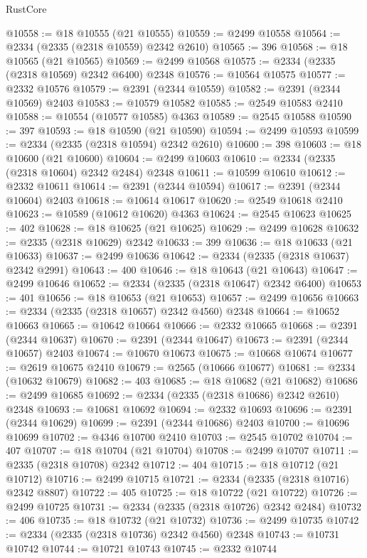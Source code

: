 \begin{lexlean}{RustCore}
\begin{coremodule}
@10558 := @18 @10555 (@21 @10555)
@10559 := @2499 @10558
@10564 := @2334 (@2335 (@2318 @10559) @2342 @2610)
@10565 := 396
@10568 := @18 @10565 (@21 @10565)
@10569 := @2499 @10568
@10575 := @2334 (@2335 (@2318 @10569) @2342 @6400) @2348
@10576 := @10564 @10575
@10577 := @2332 @10576
@10579 := @2391 (@2344 @10559)
@10582 := @2391 (@2344 @10569) @2403
@10583 := @10579 @10582
@10585 := @2549 @10583 @2410
@10588 := @10554 (@10577 @10585) @4363
@10589 := @2545 @10588
@10590 := 397
@10593 := @18 @10590 (@21 @10590)
@10594 := @2499 @10593
@10599 := @2334 (@2335 (@2318 @10594) @2342 @2610)
@10600 := 398
@10603 := @18 @10600 (@21 @10600)
@10604 := @2499 @10603
@10610 := @2334 (@2335 (@2318 @10604) @2342 @2484) @2348
@10611 := @10599 @10610
@10612 := @2332 @10611
@10614 := @2391 (@2344 @10594)
@10617 := @2391 (@2344 @10604) @2403
@10618 := @10614 @10617
@10620 := @2549 @10618 @2410
@10623 := @10589 (@10612 @10620) @4363
@10624 := @2545 @10623
@10625 := 402
@10628 := @18 @10625 (@21 @10625)
@10629 := @2499 @10628
@10632 := @2335 (@2318 @10629) @2342
@10633 := 399
@10636 := @18 @10633 (@21 @10633)
@10637 := @2499 @10636
@10642 := @2334 (@2335 (@2318 @10637) @2342 @2991)
@10643 := 400
@10646 := @18 @10643 (@21 @10643)
@10647 := @2499 @10646
@10652 := @2334 (@2335 (@2318 @10647) @2342 @6400)
@10653 := 401
@10656 := @18 @10653 (@21 @10653)
@10657 := @2499 @10656
@10663 := @2334 (@2335 (@2318 @10657) @2342 @4560) @2348
@10664 := @10652 @10663
@10665 := @10642 @10664
@10666 := @2332 @10665
@10668 := @2391 (@2344 @10637)
@10670 := @2391 (@2344 @10647)
@10673 := @2391 (@2344 @10657) @2403
@10674 := @10670 @10673
@10675 := @10668 @10674
@10677 := @2619 @10675 @2410
@10679 := @2565 (@10666 @10677)
@10681 := @2334 (@10632 @10679)
@10682 := 403
@10685 := @18 @10682 (@21 @10682)
@10686 := @2499 @10685
@10692 := @2334 (@2335 (@2318 @10686) @2342 @2610) @2348
@10693 := @10681 @10692
@10694 := @2332 @10693
@10696 := @2391 (@2344 @10629)
@10699 := @2391 (@2344 @10686) @2403
@10700 := @10696 @10699
@10702 := @4346 @10700 @2410
@10703 := @2545 @10702
@10704 := 407
@10707 := @18 @10704 (@21 @10704)
@10708 := @2499 @10707
@10711 := @2335 (@2318 @10708) @2342
@10712 := 404
@10715 := @18 @10712 (@21 @10712)
@10716 := @2499 @10715
@10721 := @2334 (@2335 (@2318 @10716) @2342 @8807)
@10722 := 405
@10725 := @18 @10722 (@21 @10722)
@10726 := @2499 @10725
@10731 := @2334 (@2335 (@2318 @10726) @2342 @2484)
@10732 := 406
@10735 := @18 @10732 (@21 @10732)
@10736 := @2499 @10735
@10742 := @2334 (@2335 (@2318 @10736) @2342 @4560) @2348
@10743 := @10731 @10742
@10744 := @10721 @10743
@10745 := @2332 @10744

\end{coremodule}
\end{lexlean}
